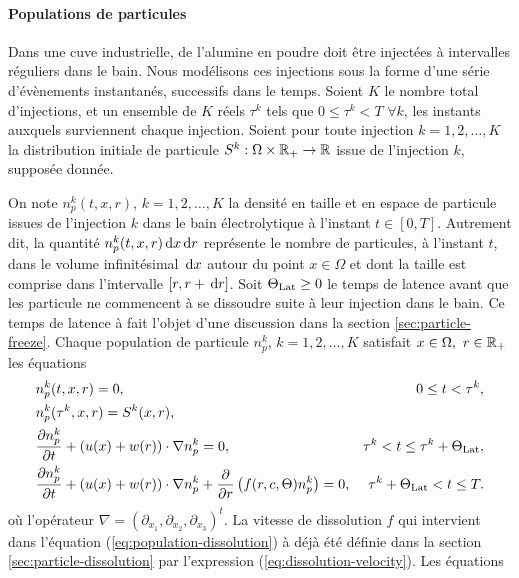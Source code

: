 \paragraph{Populations de particules}
Dans une cuve industrielle, de l'alumine en poudre doit être injectées
à intervalles réguliers dans le bain. Nous modélisons ces injections
sous la forme d'une série d'évènements instantanés, successifs dans le
temps. Soient $K$ le nombre total d'injections, et un ensemble de $K$
réels $\tau^k$ tels que $0\leq \tau^k < T$ $\forall k$, les instants
auxquels surviennent chaque injection. Soient pour toute injection $k
= 1,2, \dots, K$ la distribution initiale de particule
$S^k:\Omega\times\mathbb R_+\to\mathbb R$ issue de l'injection $k$,
supposée donnée.

On note $n_p^k(t, x, r)$, $k = 1, 2, \dots, K$ la densité en taille et
en espace de particule issues de l'injection $k$ dans le bain
électrolytique à l'instant $t \in [0, T]$. Autrement dit, la quantité
$n_p^k(t, x, r)\,\mathrm dx\,\mathrm dr$ représente le nombre de particules, à
l'instant $t$, dans le volume infinitésimal $\,\mathrm dx$ autour du point
$x\in\Omega$ et dont la taille est comprise dans l'intervalle $[r,
  r+\,\mathrm dr]$. Soit $\Theta_\text{Lat} \geq 0$ le temps de latence avant que les
particule ne commencent à se dissoudre suite à leur injection dans le
bain. Ce temps de latence à fait l'objet d'une discussion dans la
section \ref{sec:particle-freeze}. Chaque population de particule
$n_p^k$, $k = 1, 2,\dots, K$ satisfait $x\in\Omega,\ r\in\mathbb R_+$ les
équations
\begin{align}
  &n_p^k(t, x, r) = 0, & 0\leq t < \tau^k,\label{eq:population-pre-injection}\\
  &n_p^k(\tau^k, x, r) = S^k(x, r),\label{eq:population-injection}\\
  &\frac{\partial n_p^k}{\partial t} + (u(x) + w(r))\cdot \nabla n_p^k
  = 0, &\tau^k < t \leq \tau^k +
  \Theta_\text{Lat},\label{eq:population-transport}\\
  &\frac{\partial n_p^k}{\partial t} + (u(x) + w(r))\cdot \nabla n_p^k
  + \frac{\partial}{\partial r} \left( f(r, c,
    \Theta) n_p^k \right) = 0, &\tau^k + \Theta_\text{Lat} < t \leq T.\label{eq:population-dissolution}
\end{align}
où l'opérateur $\nabla = (\partial_{x_1}, \partial_{x_2},
\partial_{x_3})^t$. La vitesse de dissolution $f$ qui intervient dans
l'équation (\ref{eq:population-dissolution}) à déjà été définie dans
la section \ref{sec:particle-dissolution} par l'expression
(\ref{eq:dissolution-velocity}). Les équations
